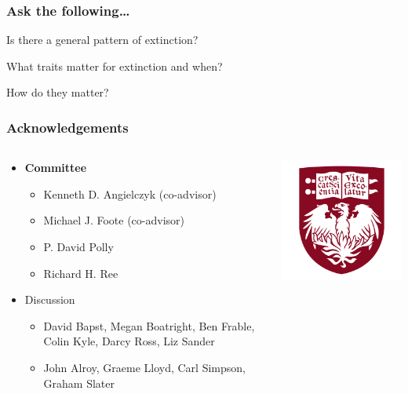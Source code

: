 \documentclass{beamer}
\begin{document}
\begin{frame}
  \frametitle{Ask the following\dots}

  \begin{center}
    Is there a \alert{general pattern} of extinction?

    \vspace{0.75cm}

    \alert{What} traits matter for extinction and \alert{when}?

    \vspace{0.75cm}

    \alert{How} do they matter?
  \end{center}
\end{frame}

\begin{frame}
  \frametitle{Acknowledgements}
  \begin{columns}
    \begin{column}{0.5\textwidth}
      \begin{itemize}
        \item \textbf{Committee}
          \begin{itemize}
            \item Kenneth D. Angielczyk (co-advisor)
            \item Michael J. Foote (co-advisor)
            \item P. David Polly
            \item Richard H. Ree
          \end{itemize}
        \item Discussion
          \begin{itemize}
            \item David Bapst, Megan Boatright, Ben Frable, Colin Kyle, Darcy Ross, Liz Sander
            \item John Alroy, Graeme Lloyd, Carl Simpson, Graham Slater
          \end{itemize}
      \end{itemize}
    \end{column}
    \begin{column}{0.5\textwidth}
      \includegraphics[height = 0.3\textheight, keepaspectratio = true]{figure/chicago} \\

\end{column}
\end{columns}
\end{frame}
\end{document}
